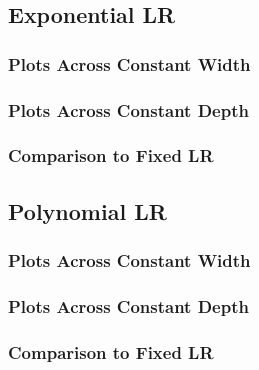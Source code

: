 \documentclass[a4paper, 12pt]{report}
\begin{document}
\begin{center}
\subsection{Exponential LR}
\begin{comment}
\end{comment}
\subsubsection{Plots Across Constant Width}
\begin{comment}
\end{comment}
\subsubsection{Plots Across Constant Depth}
\begin{comment}
\end{comment}
\subsubsection{Comparison to Fixed LR}
\begin{comment}
\end{comment}

\subsection{Polynomial LR}
\begin{comment}
\end{comment}
\subsubsection{Plots Across Constant Width}
\begin{comment}
\end{comment}
\subsubsection{Plots Across Constant Depth}
\begin{comment}
\end{comment}
\subsubsection{Comparison to Fixed LR}
\begin{comment}
\end{comment}

\end{center}
\end{document}
